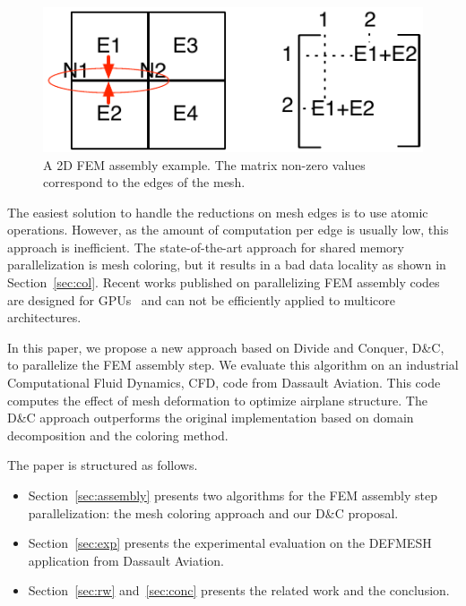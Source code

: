 \documentclass[10pt]{IOS-Book-Article}
\begin{document}
\begin{figure}[htp]
 \includegraphics[scale=0.6]{FEM_ass.pdf}
 \caption{A 2D FEM assembly example. The matrix non-zero values correspond to the edges of the mesh.}
 \label{fig:2Dasm}
\end{figure}


The easiest solution to handle the reductions on mesh edges is to use atomic operations.
However, as the amount of computation per edge is usually low, this approach is inefficient.
The state-of-the-art approach for shared memory parallelization is mesh coloring, but it results in a bad data locality as shown in Section~\ref{sec:col}.
Recent works published on parallelizing FEM assembly codes are designed for GPUs~\cite{cecka2011assembly,CPUGPUasm} and can not be efficiently applied to multicore architectures.

In this paper, we propose a new approach based on Divide and Conquer, D\&C, to parallelize the FEM assembly step.
We evaluate this algorithm on an industrial Computational Fluid Dynamics, CFD, code from Dassault Aviation.
This code computes the effect of mesh deformation to optimize airplane structure.
The D\&C approach outperforms the original implementation based on domain decomposition and the coloring method.

The paper is structured as follows.
\begin{itemize}
\item Section~\ref{sec:assembly} presents  two algorithms for the FEM assembly step parallelization: the mesh coloring approach and our D\&C proposal.
\item Section~\ref{sec:exp} presents the experimental evaluation on the DEFMESH application from Dassault Aviation.
\item Section~\ref{sec:rw} and~\ref{sec:conc} presents the related work and the conclusion.
\end{itemize}

\end{document}
